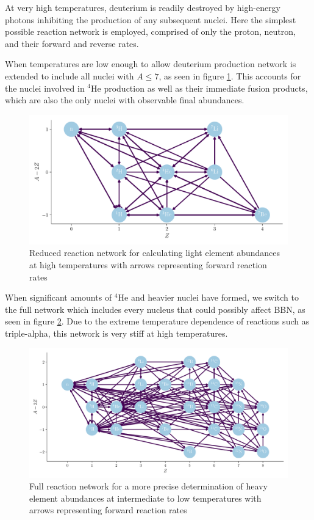 At very high temperatures, deuterium is readily destroyed by high-energy photons inhibiting the production of any subsequent nuclei. Here the simplest possible reaction network is employed, comprised of only the proton, neutron, and their forward and reverse rates. 

When temperatures are low enough to allow deuterium production network is extended to include all nuclei with $A\leq 7$, as seen in figure \ref{fig:smallnet}. This accounts for the nuclei involved in ${}^4$He production as well as their immediate fusion products, which are also the only nuclei with observable final abundances. 

\begin{figure}[ht]
    \includegraphics[width=5.1in]{figures/lillenet.pdf}
    \caption{Reduced reaction network for calculating light element abundances at high temperatures with arrows representing forward reaction rates}
    \label{fig:smallnet}
\end{figure}

When significant amounts of ${}^4$He and heavier nuclei have formed, we switch to the full network which includes every nucleus that could possibly affect BBN, as seen in figure \ref{fig:bignet}. Due to the extreme temperature dependence of reactions such as triple-alpha, this network is very stiff at high temperatures. 

\begin{figure}[ht]
    \includegraphics[width=5.1in]{figures/stornet.pdf}
    \caption{Full reaction network for a more precise determination of heavy element abundances at intermediate to low temperatures with arrows representing forward reaction rates}
    \label{fig:bignet}
\end{figure}

